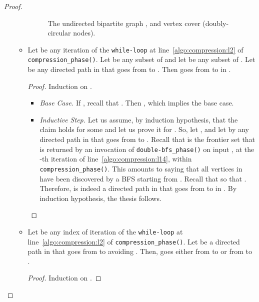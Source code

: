 \begin{proof}
\begin{enumerate}
\begin{itemize}
\begin{figure}[!htb]
    \caption{The undirected bipartite graph , 
	and vertex cover  (doubly-circular nodes).}
\label{fig:undirected_bipartite_vertex_cover}
\end{figure}

\item[] \begin{lemma}\label{lemma:inv:2}
Let  be any iteration of the \texttt{while-loop} at line~\ref{algo:compression:l2} of \texttt{compression\_phase()}.
Let  be any subset of  and let  be any subset of . Let  be any directed path in  that goes from  to .
Then  goes from  to  in .
\end{lemma}
\begin{proof}
Induction on .
\begin{itemize}
\item \emph{Base Case.} If , recall that . Then , which  implies the base case.
\item \emph{Inductive Step.}
Let us assume, by induction hypothesis, that the claim holds for some 
and let us prove it for .
So, let , and let  by any directed path
in  that goes from  to .
Recall that  is the frontier set that
is returned by an invocation of \texttt{double-bfs\_phase()}
on input , at the -th iteration of line~\ref{algo:compression:l14}, within \texttt{compression\_phase()}.
This amounts to saying that all vertices in  have been discovered by a BFS starting from .
Recall that  so that .
Therefore,  is indeed a directed path in  that goes from  to  in .
By induction hypothesis, the thesis follows.
\end{itemize}
\end{proof}

\item[] \begin{lemma}\label{lemma:inv:3}
Let  be any index of iteration of the \texttt{while-loop}
at line~\ref{algo:compression:l2} of \texttt{compression\_phase()}.
Let  be a directed path in  that goes from  to   avoiding .
Then,  goes either from  to  or from  to .
\end{lemma}
\begin{proof}
Induction on .


\end{proof}
\end{itemize}
\end{enumerate}
\end{proof}
